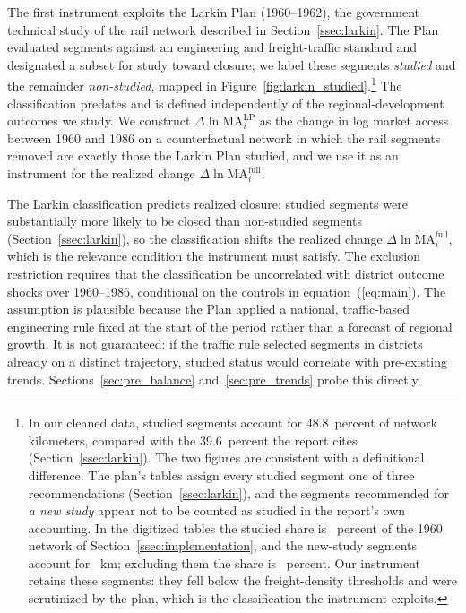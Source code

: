 The first instrument exploits the Larkin Plan (1960--1962), the
government technical study of the rail network described in
Section~\ref{ssec:larkin}. The Plan evaluated segments against an
engineering and freight-traffic standard and designated a subset for
study toward closure; we label these segments \emph{studied} and the
remainder \emph{non-studied}, mapped in
Figure~\ref{fig:larkin_studied}.\footnote{In our cleaned data, studied
segments account for 48.8~percent of network kilometers, compared
with the 39.6~percent the report cites
(Section~\ref{ssec:larkin}). The two figures are consistent with a
definitional difference. The plan's tables assign every studied
segment one of three recommendations
(Section~\ref{ssec:larkin}), and the segments recommended for
\emph{a new study} appear not to be counted as studied in the
report's own accounting. In the digitized tables the
studied share is \railStudiedShare{}~percent of the 1960 network of
Section~\ref{ssec:implementation}, and the new-study segments account
for \railKmNewStudy{}~km; excluding them the share is
\railStudiedShareExNewStudy{}~percent. Our instrument retains these
segments: they fell below the freight-density thresholds and were
scrutinized by the plan, which is the classification the instrument
exploits.} The classification predates and is defined
independently of the regional-development outcomes we study. We
construct $\Delta \ln \mathrm{MA}^{\mathrm{LP}}_i$ as the change in log
market access between 1960 and 1986 on a counterfactual network in
which the rail segments removed are exactly those the Larkin Plan
studied, and we use it as an instrument for the realized change
$\Delta \ln \mathrm{MA}^{\mathrm{full}}_i$.

The Larkin classification predicts realized closure: studied segments
were substantially more likely to be closed than non-studied segments
(Section~\ref{ssec:larkin}), so the classification shifts the realized
change $\Delta \ln \mathrm{MA}^{\mathrm{full}}_i$, which is the
relevance condition the instrument must satisfy. The exclusion
restriction requires that the classification be uncorrelated with
district outcome shocks over 1960--1986, conditional on the controls in
equation~(\ref{eq:main}). The assumption is plausible because the Plan
applied a national, traffic-based engineering rule fixed at the start
of the period rather than a forecast of regional growth. It is not
guaranteed: if the traffic rule selected segments in districts already
on a distinct trajectory, studied status would correlate with
pre-existing trends. Sections~\ref{sec:pre_balance}
and~\ref{sec:pre_trends} probe this directly.

